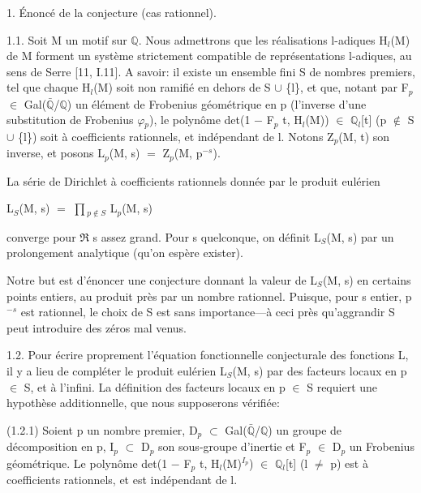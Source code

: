 \documentclass[10pt,twoside]{article}
\begin{document}
1. Énoncé de la conjecture (cas rationnel).\par
1.1. Soit M un motif sur \ensuremath{ℚ}. Nous admettrons que les réalisations l-adiques H\ensuremath{_{l}}(M) de M forment un système strictement compatible de représentations l-adiques, au sens de Serre [11, I.11]. A savoir: il existe un ensemble fini S de nombres premiers, tel que chaque H\ensuremath{_{l}}(M) soit non ramifié en dehors de S \ensuremath{∪} \{l\}, et que, notant par F\ensuremath{_{p}} \ensuremath{∈} Gal(\ensuremath{\bar{ℚ}}/\ensuremath{ℚ}) un élément de Frobenius géométrique en p (l’inverse d’une substitution de Frobenius \ensuremath{φ}\ensuremath{_{p}}), le polynôme det(1 \ensuremath{−} F\ensuremath{_{p}} t, H\ensuremath{_{l}}(M)) \ensuremath{∈} \ensuremath{ℚ}\ensuremath{_{l}}[t] (p \ensuremath{∉} S \ensuremath{∪} \{l\}) soit à coefficients rationnels, et indépendant de l. Notons Z\ensuremath{_{p}}(M, t) son inverse, et posons L\ensuremath{_{p}}(M, s) \ensuremath{=} Z\ensuremath{_{p}}(M, p\ensuremath{^{−s}}).\par
La série de Dirichlet à coefficients rationnels donnée par le produit eulérien\par
L\ensuremath{_{S}}(M, s) \ensuremath{=} \ensuremath{∏}\ensuremath{_{p∉S}} L\ensuremath{_{p}}(M, s)\par
converge pour \ensuremath{ℜ} s assez grand. Pour s quelconque, on définit L\ensuremath{_{S}}(M, s) par un prolongement analytique (qu’on espère exister).\par
Notre but est d’énoncer une conjecture donnant la valeur de L\ensuremath{_{S}}(M, s) en certains points entiers, au produit près par un nombre rationnel. Puisque, pour s entier, p\ensuremath{^{−s}} est rationnel, le choix de S est sans importance—à ceci près qu’aggrandir S peut introduire des zéros mal venus.\par
1.2. Pour écrire proprement l’équation fonctionnelle conjecturale des fonctions L, il y a lieu de compléter le produit eulérien L\ensuremath{_{S}}(M, s) par des facteurs locaux en p \ensuremath{∈} S, et à l’infini. La définition des facteurs locaux en p \ensuremath{∈} S requiert une hypothèse additionnelle, que nous supposerons vérifiée:\par
(1.2.1) Soient p un nombre premier, D\ensuremath{_{p}} \ensuremath{⊂} Gal(\ensuremath{\bar{ℚ}}/\ensuremath{ℚ}) un groupe de décomposition en p, I\ensuremath{_{p}} \ensuremath{⊂} D\ensuremath{_{p}} son sous-groupe d’inertie et F\ensuremath{_{p}} \ensuremath{∈} D\ensuremath{_{p}} un Frobenius géométrique. Le polynôme det(1 \ensuremath{−} F\ensuremath{_{p}} t, H\ensuremath{_{l}}(M)\ensuremath{^{I_p}}) \ensuremath{∈} \ensuremath{ℚ}\ensuremath{_{l}}[t] (l \ensuremath{≠} p) est à coefficients rationnels, et est indépendant de l.\par
\end{document}
